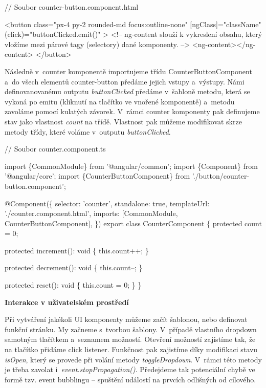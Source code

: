 \begin{prog}
// Soubor counter-button.component.html

<button
  class="px-4 py-2 rounded-md focus:outline-none"
  [ngClass]="className"
  (click)="buttonClicked.emit()"
>
  <!-- ng-content slouží k vykreslení obsahu, který vložíme
    mezi párové tagy (selectory) dané komponenty. -->
  <ng-content></ng-content>
</button>
\end{prog}

Následně v~counter komponentě importujeme třídu CounterButtonComponent a~do všech elementů counter-button předáme jejich vstupy a~výstupy. 
Námi definovanovanému outputu \emph{buttonClicked} předáme v~šabloně metodu, která se vykoná po emitu (kliknutí na tlačítko ve vnořené komponentě) a~metodu zavoláme pomocí kulatých závorek. 
V~rámci counter komponenty pak definujeme stav jako vlastnost \emph{count} na třídě. Vlastnost pak můžeme modifikovat skrze metody třídy, které voláme v~outputu \emph{buttonClicked}.

\begin{prog}
// Soubor counter.component.ts

import \{CommonModule\} from '@angular/common';
import \{Component\} from '@angular/core';
import \{CounterButtonComponent\} from './button/counter-button.component';

@Component(\{
  selector: 'counter',
  standalone: true,
  templateUrl: './counter.component.html',
  imports: [CommonModule, CounterButtonComponent],
\})
export class CounterComponent \{
  protected count = 0;

  protected increment(): void \{
    this.count++;
  \}

  protected decrement(): void \{
    this.count--;
  \}

  protected reset(): void \{
    this.count = 0;
  \}
\}
\end{prog}

\begin{flushleft}
  \textbf{Interakce v uživatelském prostředí}
\end{flushleft}

Při vytváření jakékoli UI komponenty můžeme začít šablonou, nebo definovat funkční stránku. My začneme s~tvorbou šablony. V~případě vlastního dropdown samotným tlačítkem a~seznamem možností. 
Otevření možností zajístíme tak, že na tlačítko přidáme click listener. Funkčnost pak zajistíme díky modifikaci stavu \emph{isOpen}, který se provede při volání metody \emph{toggleDropdown}. 
V~rámci této metody je třeba zavolat i~\emph{event.stopPropagation()}. Předejdeme tak potenciální chybě ve formě tzv. event bubblingu -- spuštění událostí na prvcích odlišných od cílového.

